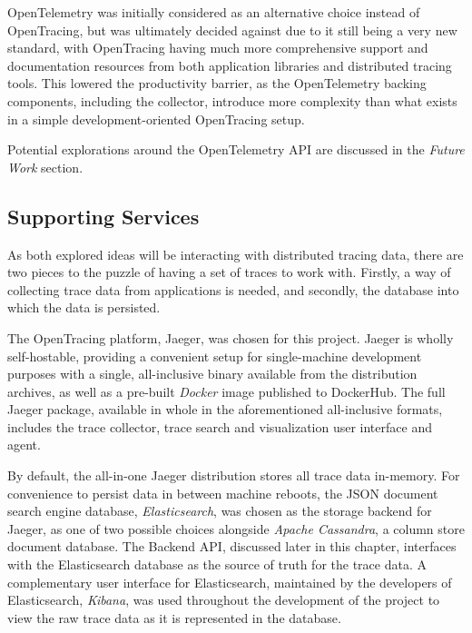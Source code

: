 \documentclass[12pt,pdftex,titlepage]{report}
\begin{document}
                OpenTelemetry was initially considered as an alternative choice instead of OpenTracing, but was ultimately decided against due to it still being a very new
                standard, with OpenTracing having much more comprehensive support and documentation resources from both application libraries and distributed tracing tools.
                This lowered the productivity barrier, as the OpenTelemetry backing components, including the collector, introduce more complexity than what exists in a simple
                development-oriented OpenTracing setup.

                Potential explorations around the OpenTelemetry API are discussed in the \textit{Future Work} section.

            \subsection{Supporting Services}
                As both explored ideas will be interacting with distributed tracing data, there are two pieces to the puzzle of having a set of traces to work with.
                Firstly, a way of collecting trace data from applications is needed, and secondly, the database into which the data is persisted.
                
                The OpenTracing platform, Jaeger, was chosen for this project. Jaeger is wholly self-hostable, providing a convenient setup for single-machine development purposes with
                a single, all-inclusive binary available from the distribution archives, as well as a pre-built \textit{Docker} image published to DockerHub. The full Jaeger package,
                available in whole in the aforementioned all-inclusive formats, includes the trace collector, trace search and visualization user interface and agent.

                By default, the all-in-one Jaeger distribution stores all trace data in-memory. For convenience to persist data in between machine reboots, the JSON document search engine
                database, \textit{Elasticsearch}, was chosen as the storage backend for Jaeger, as one of two possible choices alongside \textit{Apache Cassandra}, a column store document
                database. The Backend API, discussed later in this chapter, interfaces with the Elasticsearch database as the source of truth for the trace data. A complementary user interface
                for Elasticsearch, maintained by the developers of Elasticsearch, \textit{Kibana}, was used throughout the development of the project to view the raw trace data as it is 
                represented in the database.
\end{document}
